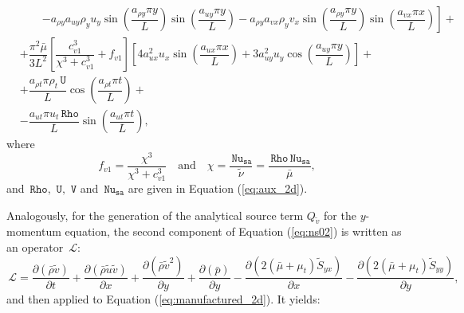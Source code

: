 \documentclass[10pt]{article}
\newcommand{\Diff}[2] {\dfrac{\partial( #1)}{\partial #2}}
\newcommand{\Rho}{\,\mathtt{Rho}}
\newcommand{\U}{\,\mathtt{U}}
\newcommand{\V}{\,\mathtt{V}}
\newcommand{\Nu}{\,\mathtt{Nu_{sa}}}
\newcommand{\Lo}{\,\mathcal{L}}
\newcommand{\brho}{\bar{\rho}}
\newcommand{\bp}{\bar{p}}
\newcommand{\tu}{\tilde{u}}
\newcommand{\tv}{\tilde{v}}
\newcommand{\tS}{\tilde{S}}
\newcommand{\bmu}{\bar{\mu}}
\begin{document}
\begin{equation}
\begin{split}
    &\qquad\left.-a_{\rho y} a_{uy} \rho_y u_y  \sin\left(\dfrac{a_{\rho y} \pi y}{L}\right)  \sin\left(\dfrac{a_{uy} \pi y}{L}\right)-a_{\rho y} a_{vx} \rho_y v_x  \sin\left(\dfrac{a_{\rho y} \pi y}{L}\right)  \sin\left(\dfrac{a_{vx} \pi x}{L}\right)\right] + \\
&+\dfrac{\pi^2 \bmu}{3L^2}\left[\dfrac{c_{v1}^3 }{ \chi^3+c_{v1}^3} +f_{v1}\right]\left[4 a_{ux}^2 u_x  \sin\left(\dfrac{a_{ux} \pi x}{L}\right)+3 a_{uy}^2 u_y  \cos\left(\dfrac{a_{uy} \pi y}{L}\right)\right] +\\
&+\dfrac{a_{\rho t} \pi \rho_t \U  }{L}\cos\left(\dfrac{a_{\rho t} \pi t}{L}\right)+ \\
&-\dfrac{a_{ut} \pi u_t \Rho  }{L}\sin\left(\dfrac{a_{ut} \pi t}{L}\right),
 \end{split}
\end{equation}
where
\begin{equation}\label{eq:chi}
  f_{v1} = \dfrac{\chi^3}{\chi^3+c_{v1}^3}\quad \mbox{and}\quad \chi =\dfrac{\Nu}{\tilde{\nu}} =\dfrac{\Rho \Nu}{\bmu},
\end{equation}
and $\Rho,\,\U,\,\V$ and $\Nu$ are given in Equation (\ref{eq:aux_2d}).


Analogously, for the generation of the analytical source term $Q_{\tv}$ for the $y$-momentum equation, the second component of Equation  (\ref{eq:ns02})  is written as an  operator $\Lo$:
\begin{equation*}
 \Lo =\Diff{\brho \tv}{t} +\Diff{\brho \tu\tv}{x}+\Diff{\brho \tv^2}{y} +\Diff{\bp}{y}-\Diff{2(\bmu+\mu_t)\tS_{yx}}{x}-\Diff{2(\bmu+\mu_t)\tS_{yy}}{y},
\end{equation*}
and then applied to Equation  (\ref{eq:manufactured_2d}). It yields:
\end{document}
